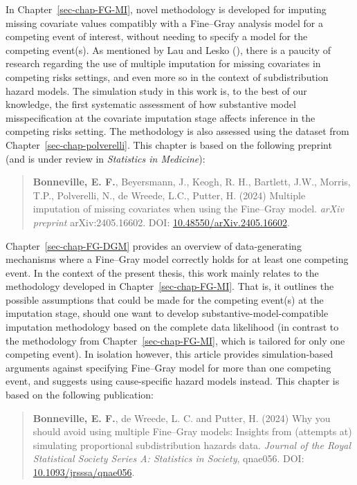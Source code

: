 \documentclass[
  letterpaper,
  DIV=11,
  numbers=noendperiod]{scrreprt}
\begin{document}
In Chapter~\ref{sec-chap-FG-MI}, novel methodology is developed for
imputing missing covariate values compatibly with a Fine--Gray analysis
model for a competing event of interest, without needing to specify a
model for the competing event(s). As mentioned by Lau and Lesko
(), there is a
paucity of research regarding the use of multiple imputation for missing
covariates in competing risks settings, and even more so in the context
of subdistribution hazard models. The simulation study in this work is,
to the best of our knowledge, the first systematic assessment of how
substantive model misspecification at the covariate imputation stage
affects inference in the competing risks setting. The methodology is
also assessed using the dataset from Chapter~\ref{sec-chap-polverelli}.
This chapter is based on the following preprint (and is under review in
\emph{Statistics in Medicine}):

\begin{quote}
\textbf{Bonneville, E. F.}, Beyersmann, J., Keogh, R. H., Bartlett,
J.W., Morris, T.P., Polverelli, N., de Wreede, L.C., Putter, H. (2024)
Multiple imputation of missing covariates when using the Fine--Gray
model. \emph{arXiv preprint} arXiv:2405.16602. DOI:
\href{https://doi.org/10.48550/arXiv.2405.16602}{10.48550/arXiv.2405.16602}.
\end{quote}

Chapter~\ref{sec-chap-FG-DGM} provides an overview of data-generating
mechanisms where a Fine--Gray model correctly holds for at least one
competing event. In the context of the present thesis, this work mainly
relates to the methodology developed in Chapter~\ref{sec-chap-FG-MI}.
That is, it outlines the possible assumptions that could be made for the
competing event(s) at the imputation stage, should one want to develop
substantive-model-compatible imputation methodology based on the
complete data likelihood (in contrast to the methodology from
Chapter~\ref{sec-chap-FG-MI}, which is tailored for only one competing
event). In isolation however, this article provides simulation-based
arguments against specifying Fine--Gray model for more than one
competing event, and suggests using cause-specific hazard models
instead. This chapter is based on the following publication:

\begin{quote}
\textbf{Bonneville, E. F.}, de Wreede, L. C. and Putter, H. (2024) Why
you should avoid using multiple Fine--Gray models: Insights from
(attempts at) simulating proportional subdistribution hazards data.
\emph{Journal of the Royal Statistical Society Series A: Statistics in
Society}, qnae056. DOI:
\href{https://doi.org/10.1093/jrsssa/qnae056}{10.1093/jrsssa/qnae056}.
\end{quote}
\end{document}
